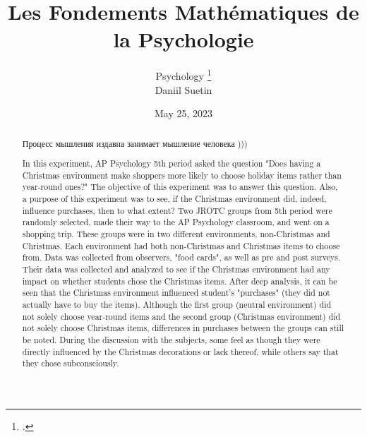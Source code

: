 \documentclass[twoside]{article}
\title{\vspace{-15mm}\fontsize{24pt}{10pt}\selectfont\textbf{Les Fondements Mathématiques de la Psychologie}} %
\author{Psychology
\large
\textsc{}\thanks{.}\\[2mm] %
\normalsize Daniil Suetin \\
\normalsize \href{mailto:}{} %
\vspace{-5mm}
}
\date{May 25, 2023}
\begin{document}
\maketitle %
\thispagestyle{fancy} %


\begin{abstract}
Процесс мышления издавна занимает мышление человека )))



In this experiment, AP Psychology 5th period asked the question "Does having a Christmas environment make shoppers more likely to choose holiday items rather than year-round ones?" The objective of this experiment was to answer this question. Also, a purpose of this experiment was to see, if the Christmas environment did, indeed, influence purchases, then to what extent? Two JROTC groups from 5th period were randomly selected, made their way to the AP Psychology classroom, and went on a shopping trip. These groups were in two different environments, non-Christmas and Christmas. Each environment had both non-Christmas and Christmas items to choose from. Data was collected from observers, "food cards", as well as pre and post surveys. Their data was collected and analyzed to see if the Christmas environment had any impact on whether students chose the Christmas items. After deep analysis, it can be seen that the Christmas environment influenced student's "purchases" (they did not actually have to buy the items). Although the first group (neutral environment) did not solely choose year-round items and the second group (Christmas environment) did not solely choose Christmas items, differences in purchases between the groups can still be noted. During the discussion with the subjects, some feel as though they were directly influenced by the Christmas decorations or lack thereof, while others say that they chose subconsciously. 

\end{abstract}

\end{document}
